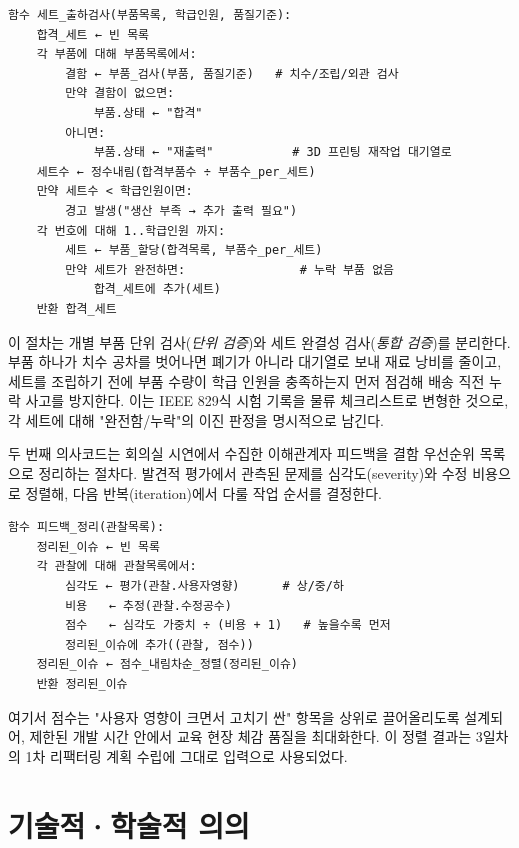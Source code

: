 \begin{verbatim}
함수 세트_출하검사(부품목록, 학급인원, 품질기준):
    합격_세트 ← 빈 목록
    각 부품에 대해 부품목록에서:
        결함 ← 부품_검사(부품, 품질기준)   # 치수/조립/외관 검사
        만약 결함이 없으면:
            부품.상태 ← "합격"
        아니면:
            부품.상태 ← "재출력"           # 3D 프린팅 재작업 대기열로
    세트수 ← 정수내림(합격부품수 ÷ 부품수_per_세트)
    만약 세트수 < 학급인원이면:
        경고 발생("생산 부족 → 추가 출력 필요")
    각 번호에 대해 1..학급인원 까지:
        세트 ← 부품_할당(합격목록, 부품수_per_세트)
        만약 세트가 완전하면:                # 누락 부품 없음
            합격_세트에 추가(세트)
    반환 합격_세트
\end{verbatim}

이 절차는 개별 부품 단위 검사(\emph{단위 검증})와 세트 완결성 검사(\emph{통합 검증})를 분리한다. 부품 하나가 치수 공차를 벗어나면 폐기가 아니라  대기열로 보내 재료 낭비를 줄이고, 세트를 조립하기 전에 부품 수량이 학급 인원을 충족하는지 먼저 점검해 배송 직전 누락 사고를 방지한다. 이는 IEEE 829식 시험 기록\cite{ieee829}을 물류 체크리스트로 변형한 것으로, 각 세트에 대해 "완전함/누락"의 이진 판정을 명시적으로 남긴다.

두 번째 의사코드는 회의실 시연에서 수집한 이해관계자 피드백을 결함 우선순위 목록으로 정리하는 절차다. 발견적 평가에서 관측된 문제를 심각도(severity)와 수정 비용으로 정렬해, 다음 반복(iteration)에서 다룰 작업 순서를 결정한다.

\begin{verbatim}
함수 피드백_정리(관찰목록):
    정리된_이슈 ← 빈 목록
    각 관찰에 대해 관찰목록에서:
        심각도 ← 평가(관찰.사용자영향)      # 상/중/하
        비용   ← 추정(관찰.수정공수)
        점수   ← 심각도 가중치 ÷ (비용 + 1)   # 높을수록 먼저
        정리된_이슈에 추가((관찰, 점수))
    정리된_이슈 ← 점수_내림차순_정렬(정리된_이슈)
    반환 정리된_이슈
\end{verbatim}

여기서 점수는 "사용자 영향이 크면서 고치기 싼" 항목을 상위로 끌어올리도록 설계되어, 제한된 개발 시간 안에서 교육 현장 체감 품질을 최대화한다. 이 정렬 결과는 3일차의 1차 리팩터링 계획 수립에 그대로 입력으로 사용되었다.

\section{기술적·학술적 의의}

